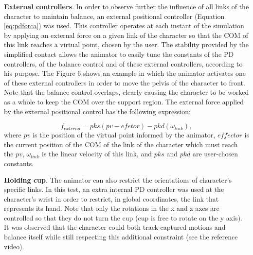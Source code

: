 \documentclass[tog]{acmsiggraph}
\begin{document}
\noindent \textbf{External controllers}. In order to observe further the influence of all links of the character to maintain balance, 
an external positional controller (Equation \ref{eq:pdforca}) was used. This controller operates at each instant of the simulation by applying an 
external force on a given link of the character so that the COM of this link reaches a virtual point, chosen by the user. The stability 
provided by the simplified contact allows the animator to easily tune the constants of the PD controllers, of the balance control and of 
these external controllers, according to his purpose. The Figure 6 shows an example in which the animator activates one of these external
controllers in order to move the pelvis of the character to front. Note that the balance control overlaps, clearly causing the character 
to be worked as a whole to keep the COM over the support region. The external force applied by the external positional control has the
following expression:

\begin{equation}
 f_{externa} = pks (pv - efetor) - pkd (\omega_{link}),
 \label{eq:pdforca}
\end{equation}
%
where $pv$ is the position of the virtual point informed by the animator, $effector$ is the current position of the COM of the link of the
character which must reach the $pv$, $\omega_{link}$ is the linear velocity of this link, and $pks$ and $pkd$ are user-chosen constants.

\noindent \textbf{Holding cup}. The animator can also restrict the orientations of character's specific links. In this test, an extra internal
PD controller was used at the character's wrist in order to restrict, in global coordinates, the link that represents its hand. Note that only
the rotations in the x and z axes are controlled so that they do not turn the cup (cup is free to rotate on the y axis). It was observed that 
the character could both track captured motions and balance itself while still respecting this additional constraint (see the reference video).



\end{document}
